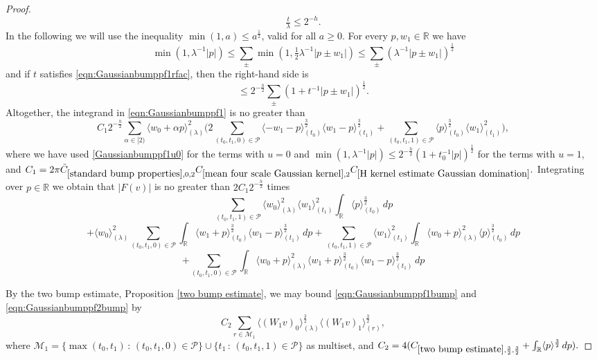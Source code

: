 \documentclass[12pt,reqno]{amsart}
\theoremstyle{plain}
\numberwithin{equation}{section}
\theoremstyle{remark}
\newcommand{\R}{{\mathbb R}}
\begin{document}
\begin{proof}[Proof]
\begin{equation}
\tfrac{t}{\lambda} \le 2^{-h}.
\end{equation}
In the following we will use the inequality $\min(1,a)\le a^\frac12$, valid for all $a\ge 0$. For every $p,w_1\in\R$ we have
\[ \min(1, \lambda^{-1}|p|) \le \sum_{\pm} \min(1, \tfrac12\lambda^{-1}|p\pm w_1|) \le \sum_{\pm} (\lambda^{-1}|p\pm w_1|)^{\tfrac12}\]
and if $t$ satisfies \eqref{eqn:Gaussianbumppf1rfac}, then the right-hand side is
\begin{equation}\label{Gaussianbumppf1u0}
\le 2^{-\tfrac{h}{2}} \sum_{\pm} (1+ t^{-1} |p\pm w_1|)^{\tfrac12}.
\end{equation}
Altogether, the integrand in \eqref{eqn:Gaussianbumppf1} is no greater than
\[ C_1 2^{-\tfrac{h}{2}} \sum_{\alpha\in[2)} \langle w_0+\alpha p\rangle_{(\lambda)}^2 \Big( 2\sum_{(t_0,t_1,0)\in\mathcal{P}} \langle -w_1-p\rangle_{(t_0)}^{\tfrac32} \langle w_1-p\rangle_{(t_1)}^{\tfrac32} +\sum_{(t_0,t_1,1)\in\mathcal{P}} \langle p\rangle^{\tfrac32}_{(t_0)} \langle w_1\rangle_{(t_1)}^2  \Big),\]
where we have used \eqref{Gaussianbumppf1u0} for the terms with $u=0$ and $\min(1,\lambda^{-1}|p|)\le 2^{-\frac{h}{2}}(1+t_0^{-1}|p|)^{\frac12}$ for the terms with $u=1$, and
$C_1 = 2\pi \tilde{C}_{\ref{standard bump properties},0,2}
C_{\ref{mean four scale Gaussian kernel},2} C_{\ref{H kernel estimate Gaussian domination}}.$
Integrating over $p\in\R$ we obtain that $|F(v)|$ is no greater than $2C_1 2^{-\frac{h}{2}}$ times
\begin{equation}\label{eqn:Gaussianbumppf1bump}
\sum_{(t_0,t_1,1)\in\mathcal{P}}\langle w_0\rangle_{(\lambda)}^2 \langle w_1\rangle^2_{(t_1)} \int_{\R}\langle p\rangle_{(t_0)}^{\tfrac32}\,dp
\end{equation}
\begin{equation}\label{eqn:Gaussianbumppf2bump}
 +\langle w_0\rangle_{(\lambda)}^2 \sum_{(t_0,t_1,0)\in\mathcal{P}} \int_{\R} \langle w_1+p\rangle_{(t_0)}^{\tfrac32} \langle w_1-p\rangle_{(t_1)}^{\tfrac32}\,dp  + \sum_{(t_0,t_1,1)\in\mathcal{P}} \langle w_1\rangle^2_{(t_1)} \int_\R \langle w_0+p\rangle_{(\lambda)}^2 \langle p\rangle_{(t_0)}^{\tfrac32}  \, dp
\end{equation}
\begin{equation}\label{eqn:Gaussianbumppf3bump}
+ \sum_{(t_0,t_1,0)\in\mathcal{P}}\int_{\R} \langle w_0+p\rangle_{(\lambda)}^2 \langle w_1+p\rangle_{(t_0)}^{\tfrac32} \langle w_1-p\rangle_{(t_1)}^{\tfrac32}\,dp
\end{equation}

By the two bump estimate, Proposition \ref{two bump estimate}, we may bound \eqref{eqn:Gaussianbumppf1bump} and \eqref{eqn:Gaussianbumppf2bump} by
\[
C_{2} \sum_{r\in \mathcal{M}_1} \langle (W_1 v)_0\rangle_{(\lambda)}^{\tfrac32}\langle (W_1 v)_1\rangle_{(r)}^{\tfrac32},
\]
where $\mathcal{M}_1=\{\max(t_0,t_1)\,:\,(t_0,t_1,0)\in \mathcal{P}\}\cup \{ t_1 \,:\,(t_0,t_1,1)\in \mathcal{P}\}$ as multiset, and
$C_2 = 4(C_{\ref{two bump estimate},\frac32,\frac32}+ \int_{\R}\langle p\rangle^{\frac32}\,dp).$


\end{proof}
\end{document}
